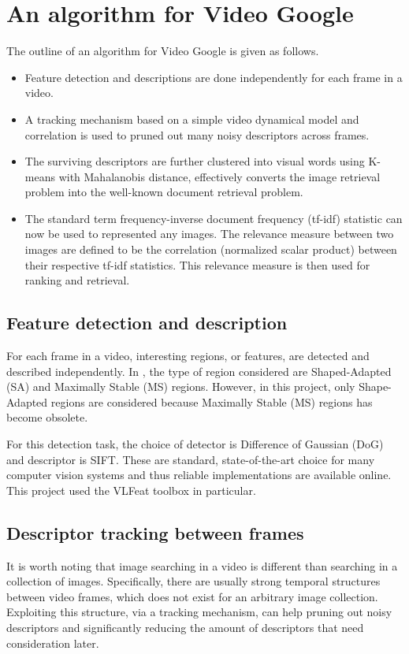 \documentclass[conference]{IEEEtran}
\begin{document}
\section{An algorithm for Video Google}
\label{sec:alg}
The outline of an algorithm for Video Google is given as follows.
\begin{itemize}
\item Feature detection and descriptions are done independently for each frame in a video.
\item A tracking mechanism based on a simple video dynamical model and correlation is used to pruned out many noisy descriptors across frames.
\item The surviving descriptors are further clustered into visual words using K-means with Mahalanobis distance, effectively converts 
the image retrieval problem into the well-known document retrieval problem.
\item The standard term frequency-inverse document frequency (tf-idf) statistic  can now be used to represented any images. The relevance measure
between two images are defined to be the correlation (normalized scalar product) between their respective tf-idf statistics. This relevance measure is
then used for ranking and retrieval.
\end{itemize}

\subsection{Feature detection and description}
For each frame in a video, interesting regions, or features, are detected and described independently. 
In \cite{sivic2003video}, the type of region considered are Shaped-Adapted (SA) and Maximally Stable (MS) regions. However, in this project,
only Shape-Adapted regions are considered because Maximally Stable (MS) regions has become obsolete. 

For this detection task, the choice of detector is Difference of Gaussian (DoG) and descriptor is SIFT. These are standard, state-of-the-art choice for many
computer vision systems and thus reliable implementations are available online. This project used the VLFeat \cite{vedaldi08vlfeat} toolbox
in particular. 

\subsection{Descriptor tracking between frames}
It is worth noting that image searching in a video is different than searching in a collection of images.
Specifically, there are usually strong temporal structures between video frames, which does not exist for an arbitrary image collection.
Exploiting this structure, via a tracking mechanism, can help pruning out noisy descriptors and significantly reducing the amount of descriptors
that need consideration later.
\end{document}
